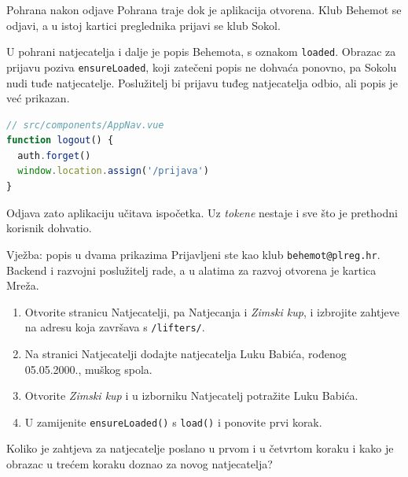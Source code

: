 \begin{frame}[fragile]{Pohrana nakon odjave}
Pohrana traje dok je aplikacija otvorena. Klub Behemot se odjavi, a u istoj kartici preglednika prijavi se klub Sokol.

\pause
\vspace{0.7em}
U pohrani natjecatelja i dalje je popis Behemota, s oznakom \texttt{loaded}. Obrazac za prijavu poziva \texttt{ensureLoaded}, koji zatečeni popis ne dohvaća ponovno, pa Sokolu nudi tuđe natjecatelje. Poslužitelj bi prijavu tuđeg natjecatelja odbio, ali popis je već prikazan.

\vspace{0.5em}
\begin{lstlisting}[language=typescript]
// src/components/AppNav.vue
function logout() {
  auth.forget()
  window.location.assign('/prijava')
}
\end{lstlisting}

\vspace{0.3em}
Odjava zato aplikaciju učitava ispočetka. Uz \emph{tokene} nestaje i sve što je prethodni korisnik dohvatio.
\end{frame}

\begin{frame}{Vježba: popis u dvama prikazima}
Prijavljeni ste kao klub \texttt{behemot@plreg.hr}. Backend i razvojni poslužitelj rade, a u alatima za razvoj otvorena je kartica Mreža.

\vspace{0.8em}
\begin{enumerate}
  \itemsep0.4em
  \item Otvorite stranicu Natjecatelji, pa Natjecanja i \emph{Zimski kup}, i izbrojite zahtjeve na adresu koja završava s \texttt{/lifters/}.
  \item Na stranici Natjecatelji dodajte natjecatelja Luku Babića, rođenog 05.05.2000., muškog spola.
  \item Otvorite \emph{Zimski kup} i u izborniku Natjecatelj potražite Luku Babića.
  \item U  zamijenite \texttt{ensureLoaded()} s \texttt{load()} i ponovite prvi korak.
\end{enumerate}

\vspace{0.8em}
Koliko je zahtjeva za natjecatelje poslano u prvom i u četvrtom koraku i kako je obrazac u trećem koraku doznao za novog natjecatelja?
\end{frame}

